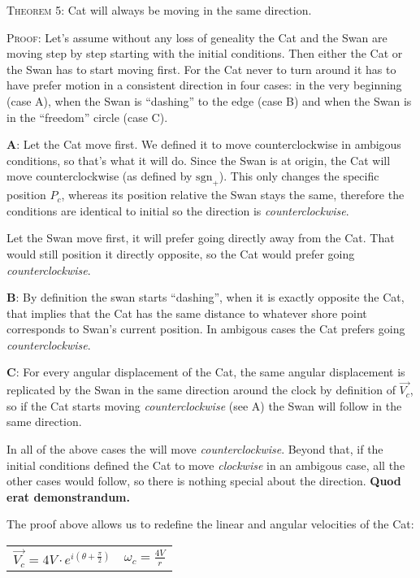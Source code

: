\documentclass[12pt]{article}
\begin{document}
\textsc{Theorem 5}: Cat will always be moving in the same direction.

\textsc{Proof}: Let's assume without any loss of geneality the Cat and the Swan are moving step by step starting with the initial conditions. Then either the Cat or the Swan has to start moving first. 
For the Cat never to turn around it has to have prefer motion in a consistent direction in four cases: in the very beginning (case A), when the Swan is ``dashing'' to the edge (case B) and when the Swan is in the ``freedom'' circle (case C).

\textbf{A}: Let the Cat move first. We defined it to move counterclockwise in ambigous conditions, so that's what it will do. Since the Swan is at origin, the Cat will move counterclockwise (as defined by $\text{sgn}_+$). This only changes the specific position $P_c$, whereas its position relative the Swan stays the same, therefore the conditions are identical to initial so the direction is \textit{counterclockwise}.

Let the Swan move first, it will prefer going directly away from the Cat. That would still position it directly opposite, so the Cat would prefer going \textit{counterclockwise}.

\textbf{B}: By definition the swan starts ``dashing'', when it is exactly opposite the Cat, that implies that the Cat has the same distance to whatever shore point corresponds to Swan's current position. In ambigous cases the Cat prefers going \textit{counterclockwise}.

\textbf{C}: For every angular displacement of the Cat, the same angular displacement is replicated by the Swan in the same direction around the clock by definition of $\vec{V_c}$, so if the Cat starts moving \textit{counterclockwise} (see A) the Swan will follow in the same direction.

In all of the above cases the will move \textit{counterclockwise}. Beyond that, if the initial conditions defined the Cat to move \textit{clockwise} in an ambigous case, all the other cases would follow, so there is nothing special about the direction. \textbf{Quod erat demonstrandum.}

The proof above allows us to redefine the linear and angular velocities of the Cat:

\begin{center}
	\begin{tabular}{c c}
		$\vec{V_c} = 4V \cdot e^{i (\theta + \frac{\pi}{2})}$ &
		$\omega_c = \frac{4V}{r}$\\
	\end{tabular}
\end{center}
\end{document}
